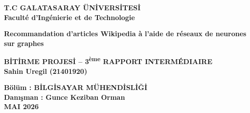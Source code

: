 \begin{titlepage}
    \begin{center}
        \large
        \vspace{-0.5cm}
        \textbf{T.C GALATASARAY \"UN\.{I}VERS\.{I}TES\.{I}}\\
        \textbf{Facult\'e d'Ing\'enierie et de Technologie}
        \vspace{3.0cm}

        \textbf{Recommandation d'articles Wikipedia à l'aide de réseaux de neurones sur graphes}

        \vspace{1.5cm}

        \textbf{B\.{I}T\.{I}RME PROJES\.{I} -- 3\textsuperscript{ème} RAPPORT INTERMÉDIAIRE}\\

        \textbf{Sahin Uregil (21401920)}

        \vspace{1.5cm}

        \textbf{B\"ol\"um : B\.{I}LG\.{I}SAYAR M\"UHEND\.{I}SL\.{I}\u{G}\.{I}}\\
        \textbf{Dan{\i}\c{s}man : Gunce Keziban Orman}\\
        \vfill
        \textbf{MAI 2026}

    \end{center}
\end{titlepage}
\restoregeometry

